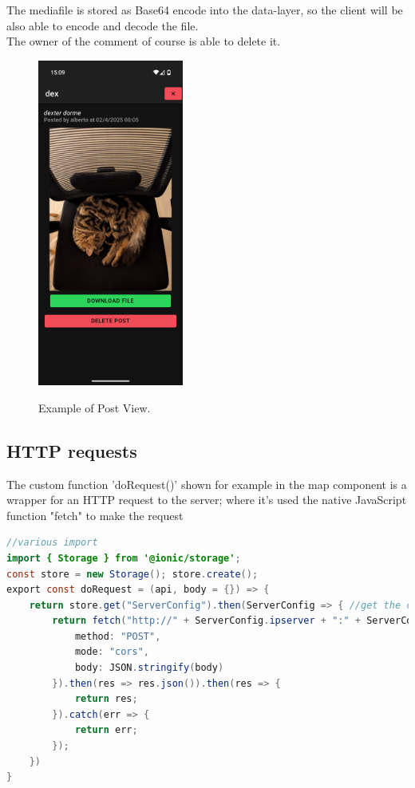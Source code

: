 \documentclass[conference]{IEEEtran}
\begin{document}
The mediafile is stored as Base64 encode into the data-layer, so the client will be also able to encode and decode the file.
\\
The owner of the comment of course is able to delete it.

\begin{figure}[htbp]
\begin{center}
{\includegraphics[width=4.8cm, height=9.5cm\textwidth]{imgs/PostView.png}}
\end{center}
\caption{Example of Post View.}
\label{fig}
\end{figure}


\subsection{HTTP requests}

The custom function 'doRequest()' shown for example in the map component is a wrapper for an HTTP request to the server; where it's used the native JavaScript function "fetch" to make the request
\begin{lstlisting}[language=Java, caption=Method doRequest to fetch server]
//various import 
import { Storage } from '@ionic/storage';
const store = new Storage(); store.create();
export const doRequest = (api, body = {}) => {
    return store.get("ServerConfig").then(ServerConfig => { //get the config from cache
        return fetch("http://" + ServerConfig.ipserver + ":" + ServerConfig.port + "/" + api, {
            method: "POST",
            mode: "cors",
            body: JSON.stringify(body)
        }).then(res => res.json()).then(res => {
            return res;
        }).catch(err => {
            return err;
        });
    })
}
\end{lstlisting}
\end{document}

